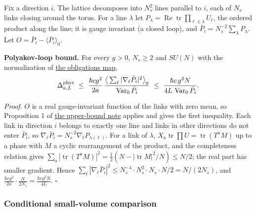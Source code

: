 \documentclass[11pt,a4paper]{article}
\begin{document}
Fix a direction \(i\). The lattice decomposes into \(N_s^2\) lines
parallel to \(i\), each of \(N_s\) links closing around the torus. For a
line \(\lambda\) let
\(P_\lambda=\operatorname{Re}\operatorname{tr}\prod_{\ell\in\lambda}U_\ell\),
the ordered product along the line; it is gauge invariant (a closed
loop), and \(\bar P_i=N_s^{-2}\sum_\lambda P_\lambda\). Let
\(O=\bar P_i-\langle\bar P_i\rangle_0\).

\textbf{Polyakov-loop bound.} For every \(g>0\), \(N_s\ge2\) and
\(SU(N)\) with the normalization of
\href{mass-gap-obligations-lattice.md}{the obligations map},
\[\Delta^{\rm phys}_{a,L}\ \le\ \frac{\hbar cg^2}{2a}\,
\frac{\big\langle\sum_\ell|\nabla_\ell\bar P_i|^2\big\rangle_0}{\operatorname{Var}_0\bar P_i}
\ \le\ \frac{\hbar c\,g^2N}{4L\,\operatorname{Var}_0\bar P_i}.\]

\emph{Proof.} \(O\) is a real gauge-invariant function of the links with
zero mean, so Proposition 1 of \href{lattice-gap-upper-bounds.md}{the
upper-bound note} applies and gives the first inequality. Each link in
direction \(i\) belongs to exactly one line and links in other
directions do not enter \(\bar P_i\), so
\(\nabla_\ell\bar P_i=N_s^{-2}\nabla_\ell P_{\lambda(\ell)}\). For a
link of \(\lambda\),
\(X_a\operatorname{tr}\prod U=\operatorname{tr}(T^aM)\) up to a phase
with \(M\) a cyclic rearrangement of the product, and the completeness
relation gives
\(\sum_a|\operatorname{tr}(T^aM)|^2=\tfrac12(N-|\operatorname{tr}M|^2/N)\le N/2\);
the real part has smaller gradient. Hence
\(\sum_\ell|\nabla_\ell\bar P_i|^2\le N_s^{-4}\cdot N_s^2\cdot N_s\cdot N/2=N/(2N_s)\),
and \(\frac{\hbar cg^2}{2a}\cdot\frac{N}{2N_s}=\frac{\hbar cg^2N}{4L}\).
\(\square\)

\hypertarget{conditional-small-volume-comparison}{%
\subsubsection{Conditional small-volume
comparison}\label{conditional-small-volume-comparison}}
\end{document}
